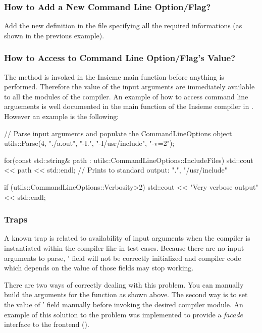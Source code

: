 \subsubsection{How to Add a New Command Line Option/Flag?}
Add the new definition in the  file specifying all the
required informations (as shown in the previous example).

\subsubsection{How to Access to Command Line Option/Flag's Value?}
The  method is invoked in the Insieme main function before
anything is performed. Therefore the value of the input arguments are
immediately available to all the modules of the compiler. An example of how to
access command line arguements is well documented in the main function of the
Insieme compiler in . However an example is the following:

\begin{srcCode}
// Parse input arguments and populate the CommandLineOptions object
utils::Parse(4, { "./a.out", "-I.", "-I/usr/include", "-v=2"}); 

for(const std::string& path : utils::CommandLineOptions::IncludeFiles) {
	std::cout << path << std::endl;
}
// Prints to standard output: ".", "/usr/include"

if (utils::CommandLineOptions::Verbosity>2) {
	std::cout << "Very verbose output" << std::endl;
}
\end{srcCode}

\subsubsection{Traps}
A known trap is related to availability of input arguments when the compiler is
instantiated within the compiler like in test cases. Because there are no input
arguments to parse, ' field will not be correctly
initialized and compiler code which depends on the value of those fields may
stop working. 

There are two ways of correctly dealing with this problem. You can manually
build the arguments for the  function as shown above.  The
second way is to set the value of ' field manually
before invoking the desired compiler module. An example of this solution to the
problem was implemented to provide a \emph{facade} interface to the frontend
(). 




